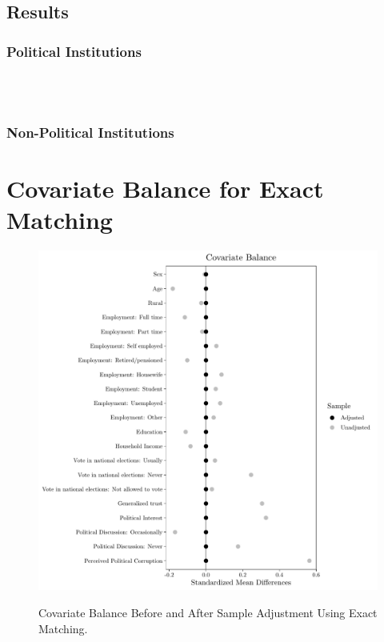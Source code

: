 \documentclass[11pt, ngerman,english,a4]{article}
\begin{document}
\subsection{Results}

\subsubsection*{Political Institutions}

\\

\newpage
\\


\newpage
\begin{landscape}
\subsubsection*{Non-Political Institutions}


\end{landscape}

\begin{landscape}


\end{landscape}

\normalsize

\section*{Covariate Balance for Exact Matching}

\begin{figure}[H]
    \caption{Covariate Balance Before and After Sample Adjustment Using Exact Matching.}
    \centering
    \includegraphics[width=0.9\linewidth]{covbalance_exact.pdf}
    \label{fig:balance}
\end{figure}
\end{document}

